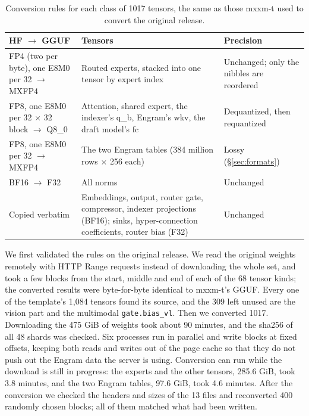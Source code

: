 \documentclass[11pt,a4paper]{article}
\newcommand{\code}[1]{\texttt{#1}}
\begin{document}
\begin{table}[h]
  \centering
  \small
  \caption{Conversion rules for each class of 1017 tensors, the same as those mxxm-t used to convert the original release.}
  \label{tab:convert}
  \begin{tabularx}{\textwidth}{@{}>{\raggedright\arraybackslash}p{4.4cm} X >{\raggedright\arraybackslash}p{3.0cm}@{}}
    \toprule
    HF $\to$ GGUF & Tensors & Precision \\
    \midrule
    FP4 (two per byte), one E8M0 per 32 $\to$ MXFP4 & Routed experts, stacked into one tensor by expert index & Unchanged; only the nibbles are reordered \\
    FP8, one E8M0 per 32 × 32 block $\to$ Q8\_0 & Attention, shared expert, the indexer's q\_b, Engram's wkv, the draft model's fc & Dequantized, then requantized \\
    FP8, one E8M0 per 32 $\to$ MXFP4 & The two Engram tables (384 million rows × 256 each) & Lossy (\S\ref{sec:formats}) \\
    BF16 $\to$ F32 & All norms & Unchanged \\
    Copied verbatim & Embeddings, output, router gate, compressor, indexer projections (BF16); sinks, hyper-connection coefficients, router bias (F32) & Unchanged \\
    \bottomrule
  \end{tabularx}
\end{table}

We first validated the rules on the original release. We read the original weights remotely with HTTP Range requests instead of downloading the whole set, and took a few blocks from the start, middle and end of each of the 68 tensor kinds; the converted results were byte-for-byte identical to mxxm-t's GGUF. Every one of the template's 1,084 tensors found its source, and the 309 left unused are the vision part and the multimodal \code{gate.bias\_vl}. Then we converted 1017. Downloading the 475 GiB of weights took about 90 minutes, and the sha256 of all 48 shards was checked. Six processes run in parallel and write blocks at fixed offsets, keeping both reads and writes out of the page cache so that they do not push out the Engram data the server is using. Conversion can run while the download is still in progress: the experts and the other tensors, 285.6 GiB, took 3.8 minutes, and the two Engram tables, 97.6 GiB, took 4.6 minutes. After the conversion we checked the headers and sizes of the 13 files and reconverted 400 randomly chosen blocks; all of them matched what had been written.
\end{document}

